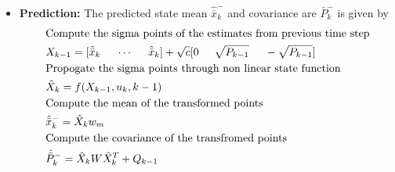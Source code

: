 \begin{itemize}
    \item \textbf{Prediction:} The predicted state mean $\hat{\bar x}^-_k$ and covariance are ${\bar P}^-_k$ is given by
    \begin{equation}
        \begin{split}
        &\text{Compute the sigma points of the estimates from previous time step}\\
        &X_{k-1} = [ \hat{\bar{x}}_k \hspace{5mm} \cdots \hspace{5mm} \hat{\bar{x}}_k]+ \sqrt c [ 0 \hspace{5mm} \sqrt{P_{k-1}} \hspace{5mm} - \sqrt{P_{k-1}} ]\\
        &\text{Propogate the sigma points through non linear state function}\\
        &\hat X_k = f(X_{k-1},u_k,k-1) \\
        &\text{Compute the mean of the transformed points }\\
        &\hat{\bar x}^-_k = \hat X_k w_m \\
        &\text{Compute the covariance of the transfromed points}\\
        &\hat{\bar P}^-_k = \hat X_k W \hat X_k^T + Q_{k-1}
        \end{split}
    \end{equation}
    

\end{itemize}
